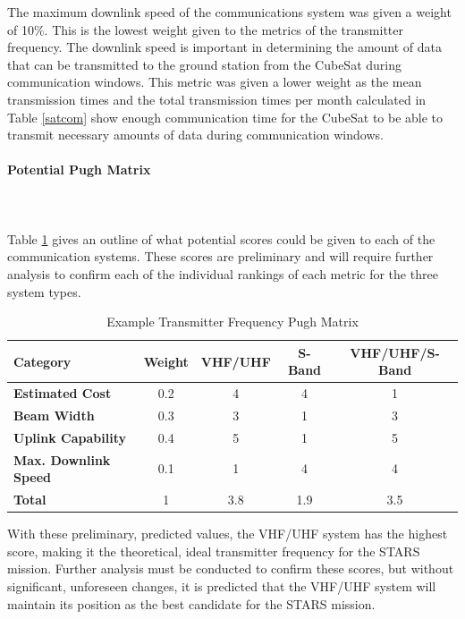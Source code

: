 The maximum downlink speed of the communications system was given a weight of 10\%. This is the lowest weight given to the metrics of the transmitter frequency. The downlink speed is important in determining the amount of data that can be transmitted to the ground station from the CubeSat during communication windows. This metric was given a lower weight as the mean transmission times and the total transmission times per month calculated in Table \ref{satcom} show enough communication time for the CubeSat to be able to transmit necessary amounts of data during communication windows. 

\paragraph{Potential Pugh Matrix} ~\\~\\
Table \ref{tbl:transmitter_pugh} gives an outline of what potential scores could be given to each of the communication systems. These scores are preliminary and will require further analysis to confirm each of the individual rankings of each metric for the three system types. 
\begin{table}[H]
\centering
\begin{tabular}{|l|c|c|c|c|} 
\hline
    \textbf{Category} & \textbf{Weight} & \textbf{VHF/UHF} & \textbf{S-Band} & \textbf{VHF/UHF/S-Band}
    \\
\hline
    \textbf{Estimated Cost} & 0.2 & 4 & 4 & 1
    \\
\hline
    \textbf{Beam Width} & 0.3 & 3 & 1 & 3
    \\
\hline
    \textbf{Uplink Capability} & 0.4 & 5 & 1 & 5
    \\
\hline
    \textbf{Max. Downlink Speed} & 0.1 & 1 & 4 & 4
    \\
\hline
    \textbf{Total} & 1 & 3.8 & 1.9 & 3.5
    \\
\hline
\end{tabular}
\caption{Example Transmitter Frequency Pugh Matrix }
\label{tbl:transmitter_pugh}
\end{table}

With these preliminary, predicted values, the VHF/UHF system has the highest score, making it the theoretical, ideal transmitter frequency for the STARS mission. Further analysis must be conducted to confirm these scores, but without significant, unforeseen changes, it is predicted that the VHF/UHF system will maintain its position as the best candidate for the STARS mission. 

